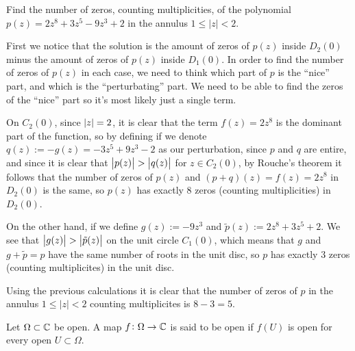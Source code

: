 \documentclass[11pt,a4paper]{article}
\begin{document}
\begin{exercise}
  Find the number of zeros, counting multiplicities, of the polynomial
  $p(z) = 2z^8 + 3z^5 - 9z^3 + 2$ in the annulus $1 \le |z| < 2$.
\end{exercise}
\begin{solution}
  First we notice that the solution is the amount of zeros of $p(z)$
  inside $D_2(0)$ minus the amount of zeros of $p(z)$ inside $D_1(0)$.
  In order to find the number of zeros of $p(z)$ in each case,
  we need to think which part of $p$ is the ``nice'' part,
  and which is the ``perturbating'' part.
  We need to be able to find the zeros of the ``nice'' part
  so it's most likely just a single term.

  On $C_2(0)$, since $\left\lvert z\right\rvert = 2$,
  it is clear that the term $f(z) = 2z^8$ is the dominant part of the function,
  so by defining
  if we denote $q(z) := -g(z) = -3z^5 + 9z^3 - 2$ as our perturbation,
  since $p$ and $q$ are entire,
  and since it is clear that $\left\lvert p(z)\right\rvert > \left\lvert q(z)\right\rvert$ for $z \in C_2(0)$,
  by Rouche's theorem it follows that the number of
  zeros of $p(z)$ and $(p + q)(z) = f(z) = 2z^8$ in $D_2(0)$ is the same,
  so $p(z)$ has exactly $8$ zeros (counting multiplicities) in $D_2(0)$.

  On the other hand, if we define $g(z) := - 9z^3$
  and $\tilde p(z) := 2z^8 + 3z^5 + 2$.
  We see that $\left\lvert g(z)\right\rvert > \left\lvert\tilde p(z)\right\rvert$ on the unit circle $C_1(0)$,
  which means that $g$ and $g + \tilde p = p$ have the same number of
  roots in the unit disc, so $p$ has exactly $3$ zeros (counting multiplicites)
  in the unit disc.

  Using the previous calculations it is clear that the number of zeros of
  $p$ in the annulus $1 \le |z| < 2$ counting multiplicites is
  $8 - 3 = 5$.
\end{solution}

\begin{definition}
  Let $\Omega \subset \mathbb{C}$ be open.
  A map $f \colon \Omega \to \mathbb{C}$ is said to be open if $f(U)$ is open
  for every open $U \subset \Omega$.
\end{definition}
\end{document}
